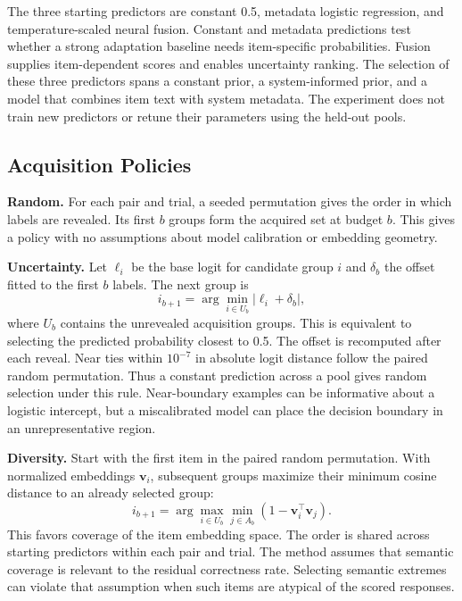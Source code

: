 \documentclass[conference]{IEEEtran}
\begin{document}
The three starting predictors are constant 0.5, metadata logistic regression, and temperature-scaled neural fusion. Constant and metadata predictions test whether a strong adaptation baseline needs item-specific probabilities. Fusion supplies item-dependent scores and enables uncertainty ranking. The selection of these three predictors spans a constant prior, a system-informed prior, and a model that combines item text with system metadata. The experiment does not train new predictors or retune their parameters using the held-out pools.

\subsection{Acquisition Policies}
\textbf{Random.} For each pair and trial, a seeded permutation gives the order in which labels are revealed. Its first $b$ groups form the acquired set at budget $b$. This gives a policy with no assumptions about model calibration or embedding geometry.

\textbf{Uncertainty.} Let $\ell_i$ be the base logit for candidate group $i$ and $\delta_b$ the offset fitted to the first $b$ labels. The next group is
\begin{equation}
i_{b+1}=\arg\min_{i\in U_b}|\ell_i+\delta_b|,
\end{equation}
where $U_b$ contains the unrevealed acquisition groups. This is equivalent to selecting the predicted probability closest to 0.5. The offset is recomputed after each reveal. Near ties within $10^{-7}$ in absolute logit distance follow the paired random permutation. Thus a constant prediction across a pool gives random selection under this rule. Near-boundary examples can be informative about a logistic intercept, but a miscalibrated model can place the decision boundary in an unrepresentative region.

\textbf{Diversity.} Start with the first item in the paired random permutation. With normalized embeddings $\mathbf{v}_i$, subsequent groups maximize their minimum cosine distance to an already selected group:
\begin{equation}
i_{b+1}=\arg\max_{i\in U_b}\min_{j\in A_b}
(1-\mathbf{v}_i^\top\mathbf{v}_j).
\end{equation}
This favors coverage of the item embedding space. The order is shared across starting predictors within each pair and trial. The method assumes that semantic coverage is relevant to the residual correctness rate. Selecting semantic extremes can violate that assumption when such items are atypical of the scored responses.
\end{document}
